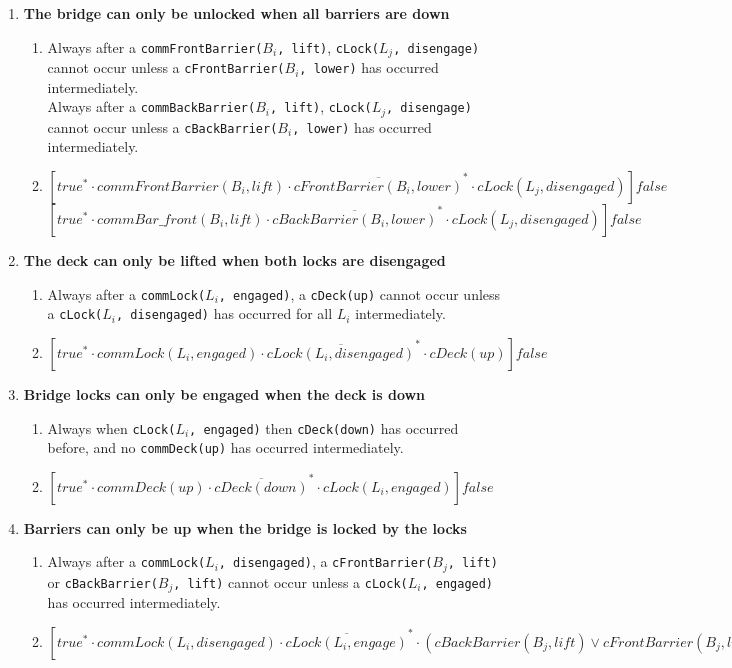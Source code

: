 \begin{enumerate}
	\item \textbf{The bridge can only be unlocked when all barriers are down}
	\begin{enumerate}
		\item Always after a \texttt{commFrontBarrier($B_i$, lift)}, \texttt{cLock($L_j$, disengage)} cannot occur unless a \texttt{cFrontBarrier($B_i$, lower)} has occurred intermediately. \\
					Always after a \texttt{commBackBarrier($B_i$, lift)}, \texttt{cLock($L_j$, disengage)} cannot occur unless a \texttt{cBackBarrier($B_i$, lower)} has occurred intermediately.
		\item $[true^* \cdot commFrontBarrier(B_i, lift) \cdot \overline{cFrontBarrier(B_i, lower)}^{*} \cdot cLock(L_j, disengaged)]false$
					$[true^* \cdot commBar\_front(B_i, lift) \cdot \overline{cBackBarrier(B_i, lower)}^{*} \cdot cLock(L_j, disengaged)]false$
	\end{enumerate}

	\item	\textbf{The deck can only be lifted when both locks are disengaged}
	\begin{enumerate}
		\item Always after a \texttt{commLock($L_i$, engaged)}, a \texttt{cDeck(up)} cannot occur unless a \texttt{cLock($L_i$, disengaged)} has occurred for all $L_i$ intermediately.
		\item $[true^* \cdot commLock(L_i, engaged)\cdot \overline{cLock(L_i, disengaged)}^{*} \cdot cDeck(up)]false$\\
	\end{enumerate}

	\item \textbf{Bridge locks can only be engaged when the deck is down}
	\begin{enumerate}
		\item Always when \texttt{cLock($L_i$, engaged)} then \texttt{cDeck(down)} has occurred before, and no \texttt{commDeck(up)} has occurred intermediately.
		\item $[true^* \cdot commDeck(up) \cdot \overline{cDeck(down)}^{*} \cdot cLock(L_i, engaged)]false$\\
	\end{enumerate}

	\item \textbf{Barriers can only be up when the bridge is locked by the locks}
	\begin{enumerate}
		\item Always after a \texttt{commLock($L_i$, disengaged)}, a \texttt{cFrontBarrier($B_j$, lift)} or \texttt{cBackBarrier($B_j$, lift)} cannot occur unless a \texttt{cLock($L_i$, engaged)} has occurred intermediately.
		\item $[true^* \cdot commLock(L_i, disengaged)\cdot \overline{cLock(L_i, engage)}^{*} \cdot (cBackBarrier(B_j, lift) \vee cFrontBarrier(B_j, lift))]false$\\
	\end{enumerate}


\end{enumerate}

